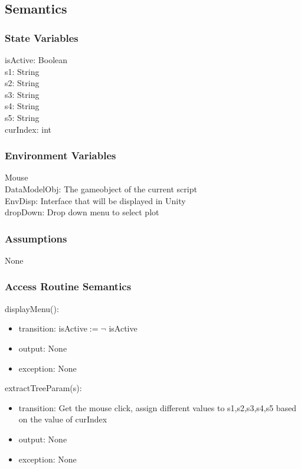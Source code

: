 \documentclass[12pt, titlepage]{article}
\begin{document}
\subsection{Semantics}

\subsubsection{State Variables}
isActive: Boolean\\
s1: String\\
s2: String\\
s3: String\\
s4: String\\
s5: String\\
curIndex: int

\subsubsection{Environment Variables}
Mouse\\
DataModelObj: The gameobject of the current script\\
EnvDisp: Interface that will be displayed in Unity\\
dropDown: Drop down menu to select plot\\
\subsubsection{Assumptions}
None
\subsubsection{Access Routine Semantics}

\noindent displayMenu():
\begin{itemize}
\item transition: isActive$\mathit{:= \neg }$ isActive
\item output: None
\item exception: None
\end{itemize}


\noindent extractTreeParam(s):
\begin{itemize}
\item transition: Get the mouse click, assign different values to s1,s2,s3,s4,s5 based on the value of curIndex
\item output: None
\item exception: None
\end{itemize}
\end{document}
